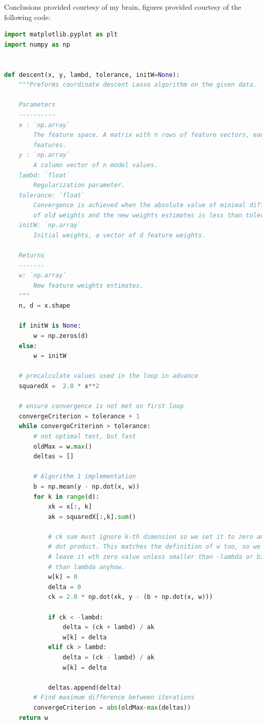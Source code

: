 \documentclass{article}
\newcommand{\1}{\mathbf{1}}
\begin{document}
\begin{enumerate}
Conclusions provided courtesy of my brain, figures provided courtesy of the following code:
    
\begin{lstlisting}[language=Python]
import matplotlib.pyplot as plt
import numpy as np


def descent(x, y, lambd, tolerance, initW=None):
    """Preforms coordinate descent Lasso algorithm on the given data.

    Parameters
    ----------
    x : `np.array`
        The feature space. A matrix with n rows of feature vectors, each with d
        features.
    y : `np.array`
        A column vector of n model values.
    lambd: `float`
        Regularization parameter.
    tolerance: `float`
        Convergence is achieved when the absolute value of minimal difference
        of old weights and the new weights estimates is less than tolerance.
    initW: `np.array`
        Initial weights, a vector of d feature weights.

    Returns
    -------
    w: `np.array`
        New feature weights estimates. 
    """
    n, d = x.shape

    if initW is None:
        w = np.zeros(d)
    else:
        w = initW

    # precalculate values used in the loop in advance
    squaredX =  2.0 * x**2

    # ensure convergence is not met on first loop
    convergeCriterion = tolerance + 1
    while convergeCriterion > tolerance:
        # not optimal test, but fast
        oldMax = w.max()
        deltas = []

        # Algorithm 1 implementation
        b = np.mean(y - np.dot(x, w))
        for k in range(d):
            xk = x[:, k]
            ak = squaredX[:,k].sum()

            # ck sum must ignore k-th dimension so we set it to zero and use
            # dot product. This matches the definition of w too, so we can
            # leave it wth zero value unless smaller than -lambda or bigger
            # than lambda anyhow. 
            w[k] = 0
            delta = 0
            ck = 2.0 * np.dot(xk, y - (b + np.dot(x, w)))

            if ck < -lambd:
                delta = (ck + lambd) / ak
                w[k] = delta
            elif ck > lambd:
                delta = (ck - lambd) / ak
                w[k] = delta

            deltas.append(delta)
        # Find maximum difference between iterations
        convergeCriterion = abs(oldMax-max(deltas))
    return w



\end{lstlisting}
\end{enumerate}
\end{document}
